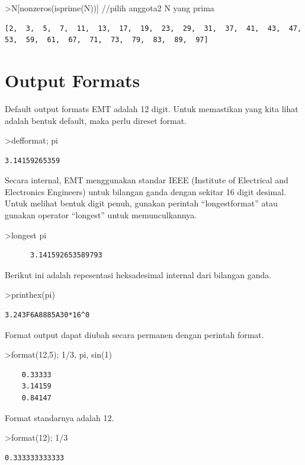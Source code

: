 \documentclass[
]{book}
\begin{document}
\textgreater N{[}nonzeros(isprime(N)){]} //pilih anggota2 N yang prima

\begin{verbatim}
[2,  3,  5,  7,  11,  13,  17,  19,  23,  29,  31,  37,  41,  43,  47,
53,  59,  61,  67,  71,  73,  79,  83,  89,  97]
\end{verbatim}

\section{Output Formats}\label{output-formats}

Default output formats EMT adalah 12 digit. Untuk memastikan yang kita lihat adalah bentuk default, maka perlu direset format.

\textgreater defformat; pi

\begin{verbatim}
3.14159265359
\end{verbatim}

Secara internal, EMT menggunakan standar IEEE (Institute of Electrical and Electronics Engineers) untuk bilangan ganda dengan sekitar 16 digit desimal. Untuk melihat bentuk digit penuh, gunakan perintah ``longestformat'' atau gunakan operator ``longest'' untuk memunculkannya.

\textgreater longest pi

\begin{verbatim}
      3.141592653589793 
\end{verbatim}

Berikut ini adalah repesentasi heksadesimal internal dari bilangan ganda.

\textgreater printhex(pi)

\begin{verbatim}
3.243F6A8885A30*16^0
\end{verbatim}

Format output dapat diubah secara permanen dengan perintah format.

\textgreater format(12,5); 1/3, pi, sin(1)

\begin{verbatim}
    0.33333 
    3.14159 
    0.84147 
\end{verbatim}

Format standarnya adalah 12.

\textgreater format(12); 1/3

\begin{verbatim}
0.333333333333
\end{verbatim}
\end{document}
